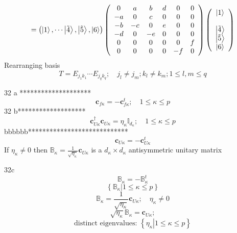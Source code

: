 \documentclass[aps,preprint]{revtex4}%
\begin{document}
\begin{equation}
=\left(  \left\vert 1\right\rangle ,\cdots\left\vert \tilde{4}\right\rangle
,\left\vert \tilde{5}\right\rangle ,\left\vert 6\right\rangle \right)  \left(
%
\begin{array}
[c]{cccccc}%
0 & a & b & d & 0 & 0\\
-a & 0 & c & 0 & 0 & 0\\
-b & -c & 0 & e & 0 & 0\\
-d & 0 & -e & 0 & 0 & 0\\
0 & 0 & 0 & 0 & 0 & f\\
0 & 0 & 0 & 0 & -f & 0
\end{array}
\right)  \left(
\begin{array}
[c]{c}%
\left\vert 1\right\rangle \\
\\
\left\vert \tilde{4}\right\rangle \\
\left\vert \tilde{5}\right\rangle \\
\left\vert 6\right\rangle
\end{array}
\right)
\end{equation}
Rearranging basis%
\begin{equation}
T=E_{j_{1}k_{1}}\cdots E_{j_{q}k_{q}};\quad j_{l}\neq j_{m};k_{l}\neq
k_{m};1\leq l,m\leq q
\end{equation}


32 a ********************%
\[
\mathbf{c}_{f\kappa}=-\mathbf{c}_{f\kappa}^{t};\quad1\leq\kappa\leq p
\]
32 b*******************%
\[
\mathbf{c}_{U\kappa}^{\dagger}\mathbf{c}_{U\kappa}=\eta_{\kappa}%
\mathbb{I}_{d_{\kappa}};\quad1\leq\kappa\leq p
\]
bbbbbb****************************%
\[
\mathbf{c}_{U\kappa}=-\mathbf{c}_{U\kappa}^{t}%
\]
If $\eta_{\kappa}\neq0$ then $\mathbb{B}_{\kappa}=\frac{1}{\sqrt{\eta_{\kappa
}}}\mathbf{c}_{U\kappa}$ is a $d_{\kappa}\times d_{\kappa}$ antisymmetric
unitary matrix

32c%
\[
\mathbb{B}_{\kappa}=-\mathbb{B}_{\kappa}^{t}%
\]%
\[
\left\{  \left.  \mathbb{B}_{\kappa}\right\vert 1\leq\kappa\leq p\right\}
\]%
\[
\mathbb{B}_{\kappa}=\frac{1}{\sqrt{\eta_{\kappa}}}\mathbf{c}_{U\kappa}%
;\quad\eta_{\kappa}\neq0
\]%
\[
\sqrt{\eta_{\kappa}}\mathbb{B}_{\kappa}=\mathbf{c}_{U\kappa};
\]%
\[
\text{distinct eigenvalues: }\left\{  \left.  \eta_{\kappa}\right\vert
1\leq\kappa\leq p\right\}
\]
\end{document}
